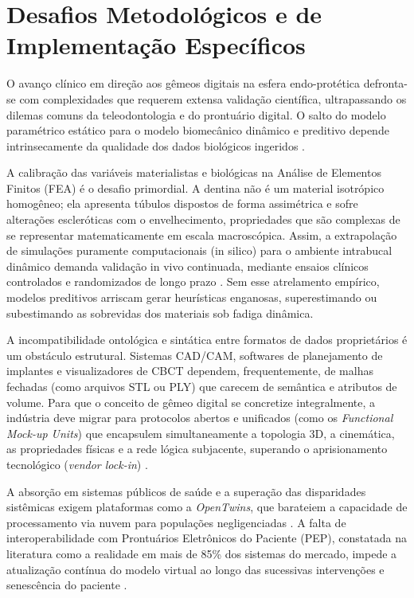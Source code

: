 \section{Desafios Metodológicos e de Implementação Específicos}

O avanço clínico em direção aos gêmeos digitais na esfera endo-protética defronta-se com complexidades que requerem extensa validação científica, ultrapassando os dilemas comuns da teleodontologia e do prontuário digital. O salto do modelo paramétrico estático para o modelo biomecânico dinâmico e preditivo depende intrinsecamente da qualidade dos dados biológicos ingeridos \cite{ijmi2026disability}.

A calibração das variáveis materialistas e biológicas na Análise de Elementos Finitos (FEA) é o desafio primordial. A dentina não é um material isotrópico homogêneo; ela apresenta túbulos dispostos de forma assimétrica e sofre alterações escleróticas com o envelhecimento, propriedades que são complexas de se representar matematicamente em escala macroscópica. Assim, a extrapolação de simulações puramente computacionais (in silico) para o ambiente intrabucal dinâmico demanda validação in vivo continuada, mediante ensaios clínicos controlados e randomizados de longo prazo \cite{li2025impacts}. Sem esse atrelamento empírico, modelos preditivos arriscam gerar heurísticas enganosas, superestimando ou subestimando as sobrevidas dos materiais sob fadiga dinâmica.

A incompatibilidade ontológica e sintática entre formatos de dados proprietários é um obstáculo estrutural. Sistemas CAD/CAM, softwares de planejamento de implantes e visualizadores de CBCT dependem, frequentemente, de malhas fechadas (como arquivos STL ou PLY) que carecem de semântica e atributos de volume. Para que o conceito de gêmeo digital se concretize integralmente, a indústria deve migrar para protocolos abertos e unificados (como os \textit{Functional Mock-up Units}) que encapsulem simultaneamente a topologia 3D, a cinemática, as propriedades físicas e a rede lógica subjacente, superando o aprisionamento tecnológico (\textit{vendor lock-in}) \cite{infante2024fmi, mdpi2025convergence}.

A absorção em sistemas públicos de saúde e a superação das disparidades sistêmicas exigem plataformas como a \textit{OpenTwins}, que barateiem a capacidade de processamento via nuvem para populações negligenciadas \cite{frota2025sus, du2020marginalized}. A falta de interoperabilidade com Prontuários Eletrônicos do Paciente (PEP), constatada na literatura como a realidade em mais de 85\% dos sistemas do mercado, impede a atualização contínua do modelo virtual ao longo das sucessivas intervenções e senescência do paciente \cite{cuadros2023access}.

